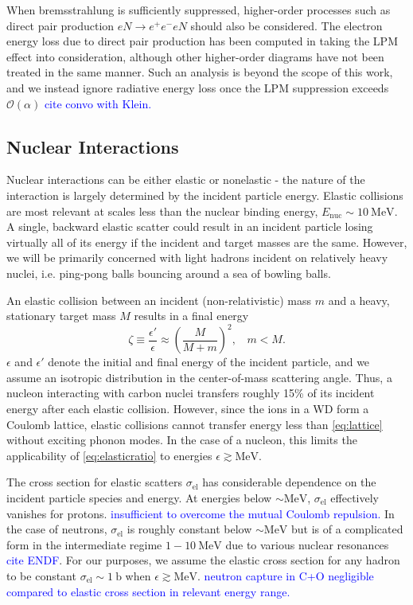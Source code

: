 \documentclass[twocolumn,showpacs,preprintnumbers,amsmath,amssymb,prd]{revtex4}
\newcommand{\OO}{\mathcal{O}}
\def\r{\right)}
\def\l{\left(}
\begin{document}
\begin{appendices}
When bremsstrahlung is sufficiently suppressed, higher-order processes such as direct pair production $e N \rightarrow e^+ e^- e N$ should also be considered. The electron energy loss due to direct pair production has been computed in \cite{Gerhardt:2010bj} taking the LPM effect into consideration, although other higher-order diagrams have not been treated in the same manner. Such an analysis is beyond the scope of this work, and we instead ignore radiative energy loss once the LPM suppression exceeds $\OO(\alpha)$ \textcolor{blue}{cite convo with Klein.}

\subsection*{Nuclear Interactions}
Nuclear interactions can be either elastic or nonelastic - the nature of the interaction is largely determined by the incident particle energy. Elastic collisions are most relevant at scales less than the nuclear binding energy, $E_\text{nuc} \sim 10 ~\text{MeV}$. A single, backward elastic scatter could result in an incident particle losing virtually all of its energy if the incident and target masses are the same. However, we will be primarily concerned with light hadrons incident on relatively heavy nuclei, i.e. ping-pong balls bouncing around a sea of bowling balls.

An elastic collision between an incident (non-relativistic) mass $m$ and a heavy, stationary target mass $M$ results in a final energy
\begin{equation}
\label{eq:elasticratio}
\zeta \equiv \frac{\epsilon'}{\epsilon} \approx \l \frac{M}{M+m} \r^2, ~~~~ m < M.
\end{equation}
$\epsilon$ and $\epsilon'$ denote the initial and final energy of the incident particle, and we assume an isotropic distribution in the center-of-mass scattering angle. Thus, a nucleon interacting with carbon nuclei transfers roughly 15\% of its incident energy after each elastic collision. However, since the ions in a WD form a Coulomb lattice, elastic collisions cannot transfer energy less than \eqref{eq:lattice} without exciting phonon modes. In the case of a nucleon, this limits the applicability of \eqref{eq:elasticratio} to energies $\epsilon \gtrsim \text{MeV}$.

The cross section for elastic scatters $\sigma_\text{el}$ has considerable dependence on the incident particle species and energy. At energies below $\sim \text{MeV}$, $\sigma_\text{el}$ effectively vanishes for protons. \textcolor{blue}{insufficient to overcome the mutual Coulomb repulsion.} In the case of neutrons, $\sigma_\text{el}$ is roughly constant below $\sim \text{MeV}$ but is of a complicated form in the intermediate regime $1 - 10 ~\text{MeV}$ due to various nuclear resonances \textcolor{blue}{cite ENDF}. For our purposes, we assume the elastic cross section for any hadron to be constant $\sigma_\text{el} \sim 1 ~\text{b}$ when $\epsilon \gtrsim \text{MeV}$. \textcolor{blue}{neutron capture in C+O negligible compared to elastic cross section in relevant energy range.}


\end{appendices}
\end{document}
